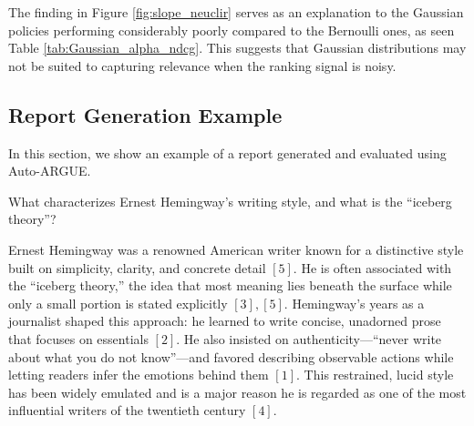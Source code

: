  The finding in Figure \ref{fig:slope_neuclir} serves as an explanation to the Gaussian policies performing considerably poorly compared to the Bernoulli ones, as seen Table \ref{tab:Gaussian_alpha_ndcg}. This suggests that Gaussian distributions may not be suited to capturing relevance when the ranking signal is noisy. 

\begin{algorithm}[ht]
\caption{Thompson Sampling in Continuous Space}\label{tab:thompson_continuous_space}
\BlankLine


\end{algorithm}

\subsection{Report Generation Example}\label{sec:app_report_gen_example}
In this section, we show an example of a report generated and evaluated using Auto-ARGUE.

 What characterizes Ernest Hemingway’s writing style, and what is the “iceberg theory”?

 Ernest Hemingway was a renowned American writer known for a distinctive style built on simplicity, clarity, and concrete detail \([5]\).
He is often associated with the “iceberg theory,” the idea that most meaning lies beneath the surface while only a small portion is stated explicitly \([3],[5]\).
Hemingway’s years as a journalist shaped this approach: he learned to write concise, unadorned prose that focuses on essentials \([2]\).
He also insisted on authenticity—“never write about what you do not know”—and favored describing observable actions while letting readers infer the emotions behind them \([1]\).
This restrained, lucid style has been widely emulated and is a major reason he is regarded as one of the most influential writers of the twentieth century \([4]\).


